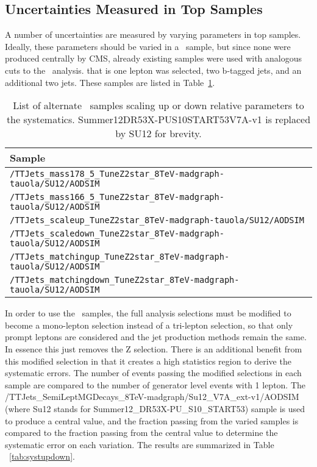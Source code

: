 \subsection{Uncertainties Measured in Top Samples}
A number of uncertainties are measured by varying parameters in top samples. Ideally, these parameters should be varied in a \ttZ \ sample, but since none were produced centrally by CMS, already existing \ttbar samples were used with analogous cuts to the \ttZ \ analysis. that is one lepton was selected, two b-tagged jets, and an additional two jets. These samples are listed in Table~\ref{tab:sampleupdown}.

\begin{table}[h]
\caption{\label{tab:sampleupdown} List of alternate \ttbar \ samples scaling up or down relative parameters to the systematics. Summer12\textunderscore DR53X-PU\textunderscore S10\textunderscore START53\textunderscore V7A-v1 is replaced by SU12 for brevity.}
\begin{center}
\begin{tabular}{l}\hline
Sample   \\ \hline
 \verb=/TTJets_mass178_5_TuneZ2star_8TeV-madgraph-tauola/SU12/AODSIM=   \\
 \verb=/TTJets_mass166_5_TuneZ2star_8TeV-madgraph-tauola/SU12/AODSIM=   \\  %
 \verb=/TTJets_scaleup_TuneZ2star_8TeV-madgraph-tauola/SU12/AODSIM=  \\
 \verb=/TTJets_scaledown_TuneZ2star_8TeV-madgraph-tauola/SU12/AODSIM=  \\ %
 \verb=/TTJets_matchingup_TuneZ2star_8TeV-madgraph-tauola/SU12/AODSIM=  \\
 \verb=/TTJets_matchingdown_TuneZ2star_8TeV-madgraph-tauola/SU12/AODSIM=  \\
\hline
\end{tabular}
\end{center}
\end{table}

In order to use the \ttbar \ samples, the full analysis selections must be modified to become a mono-lepton selection instead of a tri-lepton selection, so that only prompt leptons are considered and the jet production methods remain the same. In essence this just removes the Z selection. There is an additional benefit from this modified selection in that it creates a high statistics region to derive the systematic errors. The number of events passing the modified selections in each sample are compared to the number of generator level events with 1 lepton. The /TTJets\_SemiLeptMGDecays\_8TeV-madgraph/Su12\_V7A\_ext-v1/AODSIM  (where Su12 stands for Summer12\_DR53X-PU\_S10\_START53) sample is used to produce a central value, and the fraction passing from the varied samples is compared to the fraction passing from the central value to determine the systematic error on each variation. The results are summarized in Table ~\ref{tab:systupdown}.

